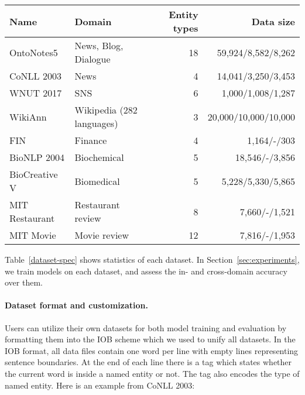 \documentclass[11pt,a4paper]{article}
\begin{document}
\begin{table*}
\centering
\begin{tabular}{llrr}
\hline
\textbf{Name}  & \textbf{Domain}      & \textbf{Entity types} & \textbf{Data size} \\
\hline
OntoNotes5     & News, Blog, Dialogue & 18 & 59,924/8,582/8,262 \\ \hline
CoNLL 2003     & News                 & 4  & 14,041/3,250/3,453 \\ \hline
WNUT 2017      & SNS                  & 6  & 1,000/1,008/1,287 \\ \hline
WikiAnn        & Wikipedia (282 languages)            & 3  & 20,000/10,000/10,000 \\ \hline
FIN            & Finance              & 4  & 1,164/-/303 \\ \hline
BioNLP 2004    & Biochemical          & 5  & 18,546/-/3,856	\\ \hline
BioCreative V  & Biomedical           & 5  & 5,228/5,330/5,865 \\ \hline
MIT Restaurant & Restaurant review    & 8  & 7,660/-/1,521 \\ \hline
MIT Movie      & Movie review         & 12 & 7,816/-/1,953 \\ \hline
\end{tabular}
\caption{\label{dataset-spec}
Overview of the NER datasets used in our evaluation and included in T-NER. Data size is the number of sentence in training/validation/test set.}
\end{table*}


Table~\ref{dataset-spec} shows statistics of each dataset.   
In Section~\ref{sec:experiments}, we train models on each dataset, and assess the in- and cross-domain accuracy over them.



\paragraph{Dataset format and customization.} Users can utilize their own datasets for both model training and evaluation by formatting them into the IOB scheme \citep{tjong-kim-sang-de-meulder-2003-introduction} which we used to unify all datasets. In the IOB format, all data files contain one word per line with empty lines representing sentence boundaries. At the end of each line there is a tag which states whether the current word is inside a named entity or not. The tag also encodes the type of named entity. Here is an example from CoNLL 2003:
\end{document}
